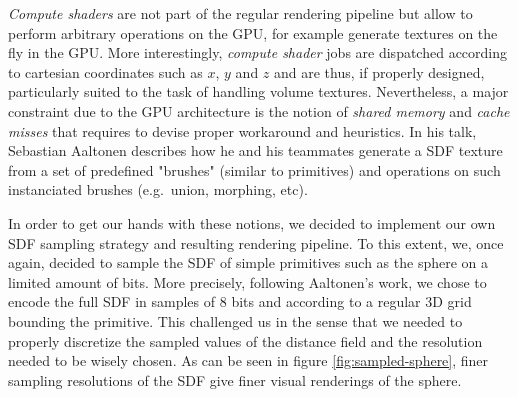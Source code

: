 \documentclass[10pt,a4paper,english, twocolumn]{article}
\begin{document}
\textit{Compute shaders} are not part of the regular rendering pipeline but allow to perform arbitrary operations on the GPU, for example generate textures on the fly in the GPU. More interestingly, \textit{compute shader} jobs are dispatched according to cartesian coordinates such as $x$, $y$ and $z$ and are thus, if properly designed, particularly suited to the task of handling volume textures. Nevertheless, a major constraint due to the GPU architecture is the notion of \textit{shared memory} and \textit{cache misses} that requires to devise proper workaround and heuristics. In his talk, Sebastian Aaltonen describes how he and his teammates generate a SDF texture from a set of predefined "brushes" (similar to primitives) and operations on such instanciated brushes (e.g.\ union, morphing, etc).

In order to get our hands with these notions, we decided to implement our own SDF sampling strategy and resulting rendering pipeline. To this extent, we, once again, decided to sample the SDF of simple primitives such as the sphere on a limited amount of bits. More precisely, following Aaltonen's work, we chose to encode the full SDF in samples of $8$ bits and according to a regular 3D grid bounding the primitive. This challenged us in the sense that we needed to properly discretize the sampled values of the distance field and the resolution needed to be wisely chosen. As can be seen in figure \ref{fig:sampled-sphere}, finer sampling resolutions of the SDF give finer visual renderings of the sphere.
\end{document}
